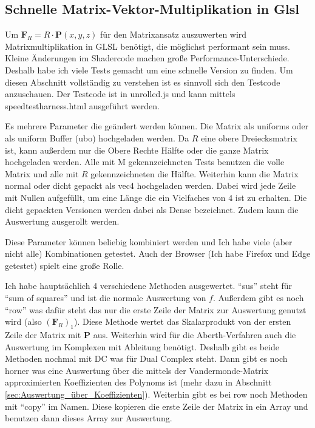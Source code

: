 \documentclass[
	ngerman,%
	accentcolor=9c,%
	ruledheaders=section,%
	class=report,%
	thesis={type=bachelor},%
	fontsize=11pt,%
	parskip=half-,%
	custommargins=true,%
	marginpar=false,%
]{tudapub}
\begin{document}
\subsection{Schnelle Matrix-Vektor-Multiplikation in Glsl}
Um \(\mathbf{F}_R=R\cdot\mathbf{P}(x,y,z)\) für den Matrixansatz auszuwerten wird Matrixmultiplikation in GLSL benötigt, die möglichst performant sein muss. Kleine Änderungen im Shadercode machen große Performance-Unterschiede. Deshalb habe ich viele Tests gemacht um eine schnelle Version zu finden.
Um diesen Abschnitt vollständig zu verstehen ist es sinnvoll sich den Testcode anzuschauen.
Der Testcode ist in unrolled.js und kann mittels speedtestharness.html ausgeführt werden. 

Es mehrere Parameter die geändert werden können. 
Die Matrix als uniforms oder als uniform Buffer (ubo) hochgeladen werden. 
Da \(R\) eine obere Dreiecksmatrix ist, kann außerdem nur die Obere Rechte Hälfte oder die ganze Matrix hochgeladen werden. Alle mit M gekennzeichneten Tests benutzen die volle Matrix und alle mit \(R\) gekennzeichneten die Hälfte.
Weiterhin kann die Matrix normal oder dicht gepackt als vec4 hochgeladen werden. Dabei wird jede Zeile mit Nullen aufgefüllt, um eine Länge die ein Vielfaches von 4 ist zu erhalten. Die dicht gepackten Versionen werden dabei als Dense bezeichnet.
Zudem kann die Auswertung ausgerollt werden.

Diese Parameter können beliebig kombiniert werden und Ich habe viele (aber nicht alle) Kombinationen getestet.
Auch der Browser (Ich habe Firefox und Edge getestet) spielt eine große Rolle.


Ich habe hauptsächlich 4 verschiedene Methoden ausgewertet. 
\enquote{sus} steht für \enquote{sum of squares} und ist die normale Auswertung von \(f\).
Außerdem gibt es noch \enquote{row} was dafür steht das nur die erste Zeile der Matrix zur Auswertung genutzt wird (also \((\mathbf{F}_R)_1\)). Diese Methode wertet das Skalarprodukt von der ersten Zeile der Matrix mit \(\mathbf{P}\) aus.
Weiterhin wird für die Aberth-Verfahren auch die Auswertung im Komplexen mit Ableitung benötigt. Deshalb gibt es beide Methoden nochmal mit DC was für Dual Complex steht.
Dann gibt es noch horner was eine Auswertung über die mittels der Vandermonde-Matrix approximierten Koeffizienten des Polynoms ist (mehr dazu in Abschnitt \ref{sec:Auswertung_über_Koeffizienten}). Weiterhin gibt es bei row noch Methoden mit \enquote{copy} im Namen. Diese kopieren die erste Zeile der Matrix in ein Array und benutzen dann dieses Array zur Auswertung.
\end{document}
